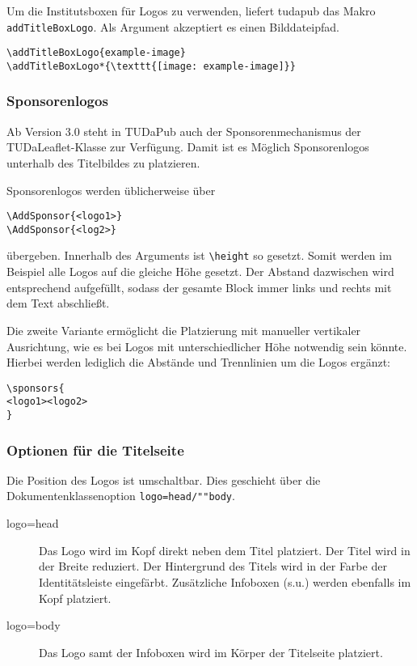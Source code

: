 \documentclass[
	german,%
	accentcolor=9c,%
]{tudapub}
\newcommand*{\code}[1]{\texttt{#1}}
\newcommand*{\cls}[1]{\textsf{#1}}
\begin{document}
Um die Institutsboxen für Logos zu verwenden, liefert \cls{tudapub} das Makro \code{addTitleBoxLogo}. Als Argument akzeptiert es einen Bilddateipfad.

\begin{verbatim}
\addTitleBoxLogo{example-image}
\addTitleBoxLogo*{\texttt{[image: example-image]}}
\end{verbatim}

\subsubsection{Sponsorenlogos}
Ab Version 3.0 steht in TUDaPub auch der Sponsorenmechanismus der TUDaLeaflet-Klasse zur Verfügung. Damit ist es Möglich Sponsorenlogos unterhalb des Titelbildes zu platzieren.

Sponsorenlogos werden üblicherweise über
\begin{verbatim}
\AddSponsor{<logo1>}
\AddSponsor{<log2>}
\end{verbatim}
übergeben. Innerhalb des Arguments ist \verb+\height+ so gesetzt. Somit werden im Beispiel alle Logos auf die gleiche Höhe gesetzt. Der Abstand dazwischen wird entsprechend aufgefüllt, sodass der gesamte Block immer links und rechts mit dem Text abschließt.

Die zweite Variante ermöglicht die Platzierung mit manueller vertikaler Ausrichtung, wie es bei Logos mit unterschiedlicher Höhe notwendig sein könnte. Hierbei werden lediglich die Abstände und Trennlinien um die Logos ergänzt:

\begin{verbatim}
\sponsors{
<logo1><logo2>
}
\end{verbatim}

\subsubsection{Optionen für die Titelseite}
Die Position des Logos ist umschaltbar. Dies geschieht über die Dokumentenklassenoption \code{logo=head/""body}.
\begin{description}
	\item[logo=head] Das Logo wird im Kopf direkt neben dem Titel platziert. Der Titel wird in der Breite reduziert. Der Hintergrund des Titels wird in der Farbe der Identitätsleiste eingefärbt. Zusätzliche Infoboxen (s.u.) werden ebenfalls im Kopf platziert.
	\item[logo=body] Das Logo samt der Infoboxen wird im Körper der Titelseite platziert.
\end{description}
\end{document}
